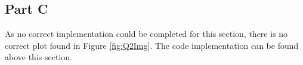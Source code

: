 \subsection{Part C}

As no correct implementation could be completed for this section, there is no
correct plot found in Figure \ref{fig:Q2Img}. The code implementation can be
found above this section.
